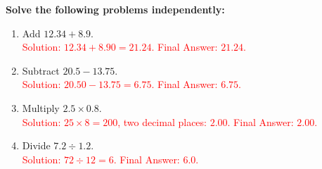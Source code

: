 \documentclass[12pt]{article}
\begin{document}
\begin{tcolorbox}[colframe=black!60, colback=white, 
coltitle=black, colbacktitle=black!15, fonttitle=\bfseries\Large, 
title=Independent Practice, halign title=center, left=10pt, right=10pt, top=10pt, bottom=15pt]
\textbf{Solve the following problems independently:}
\begin{enumerate}[itemsep=5em] 
    \item Add \( 12.34 + 8.9 \). \\
    \textcolor{red}{Solution: \( 12.34 + 8.90 = 21.24 \). Final Answer: \( 21.24 \).}\\
    \item Subtract \( 20.5 - 13.75 \). \\
    \textcolor{red}{Solution: \( 20.50 - 13.75 = 6.75 \). Final Answer: \( 6.75 \).}\\
    \item Multiply \( 2.5 \times 0.8 \). \\
    \textcolor{red}{Solution: \( 25 \times 8 = 200 \), two decimal places: \( 2.00 \). Final Answer: \( 2.00 \).}\\
    \item Divide \( 7.2 \div 1.2 \). \\
    \textcolor{red}{Solution: \( 72 \div 12 = 6 \). Final Answer: \( 6.0 \).}\\
\end{enumerate}
\end{tcolorbox}
\end{document}
